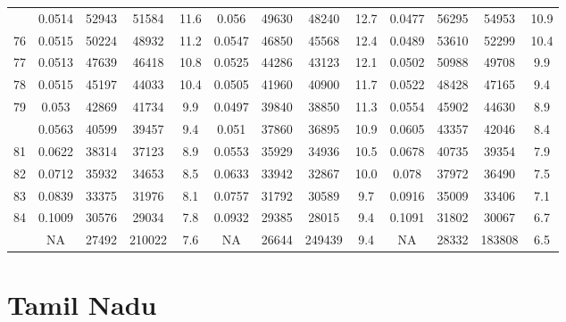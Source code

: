 \documentclass[
  14pt,
]{article}
\begin{document}
\begin{longtable}[t]{lcccccccccccc}
\addlinespace
75 & 0.0514 & 52943 & 51584 & 11.6 & 0.056 & 49630 & 48240 & 12.7 & 0.0477 & 56295 & 54953 & 10.9\\
76 & 0.0515 & 50224 & 48932 & 11.2 & 0.0547 & 46850 & 45568 & 12.4 & 0.0489 & 53610 & 52299 & 10.4\\
77 & 0.0513 & 47639 & 46418 & 10.8 & 0.0525 & 44286 & 43123 & 12.1 & 0.0502 & 50988 & 49708 & 9.9\\
78 & 0.0515 & 45197 & 44033 & 10.4 & 0.0505 & 41960 & 40900 & 11.7 & 0.0522 & 48428 & 47165 & 9.4\\
79 & 0.053 & 42869 & 41734 & 9.9 & 0.0497 & 39840 & 38850 & 11.3 & 0.0554 & 45902 & 44630 & 8.9\\
\addlinespace
80 & 0.0563 & 40599 & 39457 & 9.4 & 0.051 & 37860 & 36895 & 10.9 & 0.0605 & 43357 & 42046 & 8.4\\
81 & 0.0622 & 38314 & 37123 & 8.9 & 0.0553 & 35929 & 34936 & 10.5 & 0.0678 & 40735 & 39354 & 7.9\\
82 & 0.0712 & 35932 & 34653 & 8.5 & 0.0633 & 33942 & 32867 & 10.0 & 0.078 & 37972 & 36490 & 7.5\\
83 & 0.0839 & 33375 & 31976 & 8.1 & 0.0757 & 31792 & 30589 & 9.7 & 0.0916 & 35009 & 33406 & 7.1\\
84 & 0.1009 & 30576 & 29034 & 7.8 & 0.0932 & 29385 & 28015 & 9.4 & 0.1091 & 31802 & 30067 & 6.7\\
\addlinespace
85 & NA & 27492 & 210022 & 7.6 & NA & 26644 & 249439 & 9.4 & NA & 28332 & 183808 & 6.5\\*
\end{longtable}

\pagebreak

\hypertarget{tamil-nadu}{%
\section{Tamil Nadu}\label{tamil-nadu}}
\end{document}

